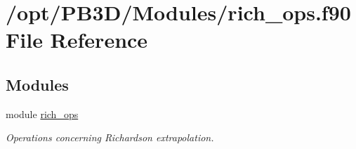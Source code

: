 \hypertarget{rich__ops_8f90}{}\section{/opt/\+P\+B3\+D/\+Modules/rich\+\_\+ops.f90 File Reference}
\label{rich__ops_8f90}
\subsection*{Modules}
\begin{DoxyCompactItemize}
\item 
module \hyperlink{namespacerich__ops}{rich\+\_\+ops}
\begin{DoxyCompactList}\small\item\em Operations concerning Richardson extrapolation. \end{DoxyCompactList}\end{DoxyCompactItemize}
